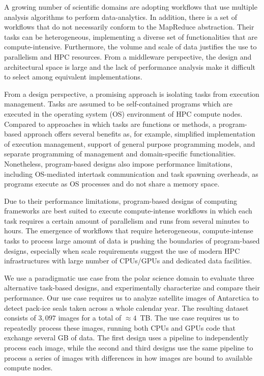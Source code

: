 \label{ch:designs}
A growing number of scientific domains are adopting workflows that use multiple analysis algorithms to perform data-analytics.
In addition, there is a set of workflows that do not necessarily conform to the MapReduce abstraction.
Their tasks can be heterogeneous, implementing a diverse set of functionalities that are compute-intensive.
Furthermore, the volume and scale of data justifies the use to parallelism and HPC resources.
From a middleware perspective, the design and architectural space is large and the lack of performance analysis make it difficult to select among equivalent implementations.

From a design perspective, a promising approach is isolating tasks from execution management.
Tasks are assumed to be self-contained programs which are executed in the operating system (OS) environment of HPC compute nodes.
Compared to approaches in which tasks are functions or methods, a program-based approach offers several benefits as, for example, simplified implementation of execution management, support of general purpose programming models, and separate programming of management and domain-specific functionalities.
Nonetheless, program-based designs also impose performance limitations, including OS-mediated intertask communication and task spawning overheads, as programs execute as OS processes and do not share a memory space.

Due to their performance limitations, program-based designs of computing frameworks are best suited to execute compute-intense workflows in which each task requires a certain amount of parallelism and runs from several minutes to hours.
The emergence of workflows that require heterogeneous, compute-intense tasks to process large amount of data is pushing the boundaries of program-based designs, especially when scale requirements suggest the use of modern HPC infrastructures with large number of CPUs/GPUs and dedicated data facilities.

We use a paradigmatic use case from the polar science domain to evaluate three alternative task-based designs, and experimentally characterize and compare their performance.
Our use case requires us to analyze satellite images of Antarctica to detect pack-ice seals taken across a whole calendar year.
The resulting dataset consists of $3,097$ images for a total of $\approx4$~TB.
The use case requires us to repeatedly process these images, running both CPUs and GPUs code that exchange several GB of data.
The first design uses a pipeline to independently process each image, while the second and third designs use the same pipeline to process a series of images with differences in how images are bound to available compute nodes.

